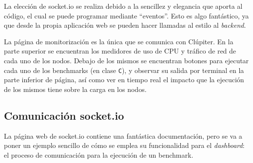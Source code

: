 La elección de socket.io se realiza debido a la sencillez y elegancia que aporta al código, el cual se puede programar mediante ``eventos''. Esto es algo fantástico, ya que desde la propia aplicación web se pueden hacer llamadas al estilo al \textit{backend}.

La página de monitorización es la única que se comunica con Clúpiter. En la parte superior se encuentran los medidores de uso de CPU y tráfico de red de cada uno de los nodos. Debajo de los mismos se encuentran botones para ejecutar cada uno de los benchmarks (en clase \texttt{C}), y observar su salida por terminal en la parte inferior de página, así como ver en tiempo real el impacto que la ejecución de los mismos tiene sobre la carga en los nodos.

\subsection{Comunicación socket.io}
\label{ssec:socket.io_comm}
La página web de socket.io contiene una fantástica documentación, pero se va a poner un ejemplo sencillo de cómo se emplea su funcionalidad para el \textit{dashboard}: el proceso de comunicación para la ejecución de un benchmark.


